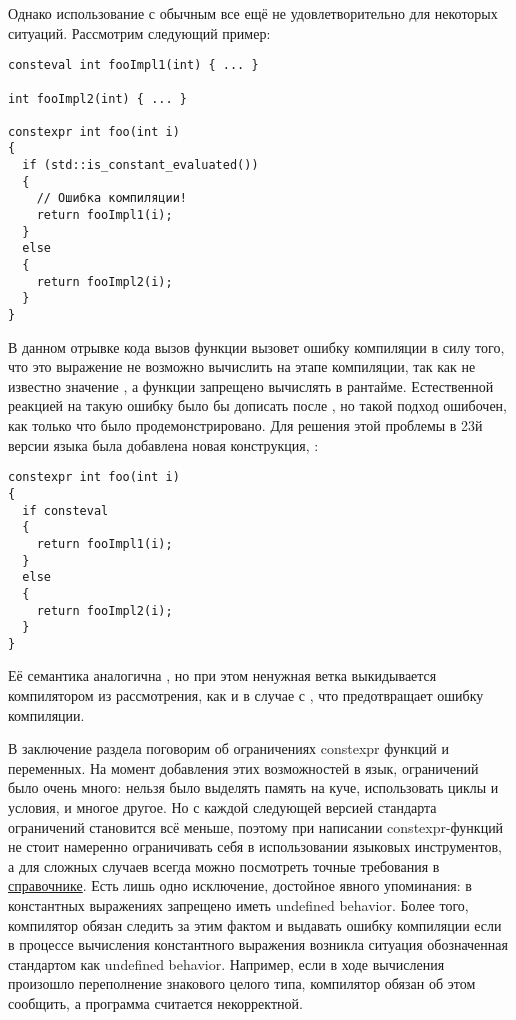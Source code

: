Однако использование  с обычным  все ещё не удовлетворительно для некоторых ситуаций.
Рассмотрим следующий пример:
\begin{verbatim}
consteval int fooImpl1(int) { ... }

int fooImpl2(int) { ... }

constexpr int foo(int i)
{
  if (std::is_constant_evaluated())
  {
    // Ошибка компиляции!
    return fooImpl1(i);
  }
  else
  {
    return fooImpl2(i);
  }
}
\end{verbatim}
В данном отрывке кода вызов функции  вызовет ошибку компиляции в силу того, что это выражение не возможно вычислить на этапе компиляции, так как не известно значение , а  функции запрещено вычислять в рантайме.
Естественной реакцией на такую ошибку было бы дописать  после , но такой подход ошибочен, как только что было продемонстрировано.
Для решения этой проблемы в 23й версии языка была добавлена новая конструкция, :
\begin{verbatim}
constexpr int foo(int i)
{
  if consteval
  {
    return fooImpl1(i);
  }
  else
  {
    return fooImpl2(i);
  }
}
\end{verbatim}
Её семантика аналогична , но при этом ненужная ветка выкидывается компилятором из рассмотрения, как и в случае с , что предотвращает ошибку компиляции.

В заключение раздела поговорим об ограничениях constexpr функций и переменных.
На момент добавления этих возможностей в язык, ограничений было очень много: нельзя было выделять память на куче, использовать циклы и условия, и многое другое.
Но с каждой следующей версией стандарта ограничений становится всё меньше, поэтому при написании constexpr-функций не стоит намеренно ограничивать себя в использовании языковых инструментов, а для сложных случаев всегда можно посмотреть точные требования в \href{https://en.cppreference.com/w/cpp/language/constexpr#:~:text=A%20constexpr%20function%20must%20satisfy%20the%20following%20requirements%3A}{справочнике}.
Есть лишь одно исключение, достойное явного упоминания: в константных выражениях запрещено иметь undefined behavior.
Более того, компилятор обязан следить за этим фактом и выдавать ошибку компиляции если в процессе вычисления константного выражения возникла ситуация обозначенная стандартом как undefined behavior.
Например, если в ходе вычисления произошло переполнение знакового целого типа, компилятор обязан об этом сообщить, а программа считается некорректной.


